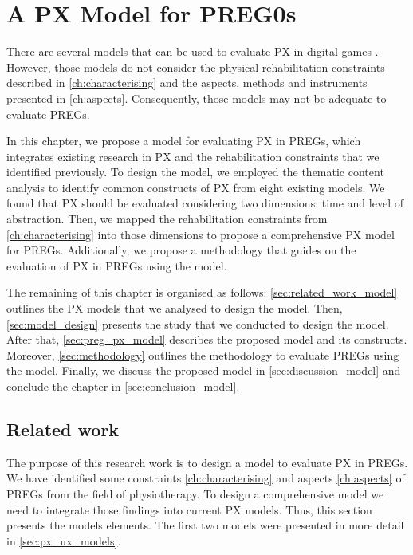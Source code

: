 \chapter{A PX Model for PREG0s}
\label{ch:model}
There are several models that can be used to evaluate \ac{PX} in digital games \autocite{Elson2014,Engl2013,Nackea2,Nacked,Fernandez2008,Mayra,DeKort2007b,Ferrara}. However, those models do not consider the physical rehabilitation constraints described in \autoref{ch:characterising} and the aspects, methods and instruments presented in \autoref{ch:aspects}. Consequently, those models may not be adequate to evaluate \acp{PREG}.

In this chapter, we propose a model for evaluating \ac{PX} in \acp{PREG}, which integrates existing research in \ac{PX} and the rehabilitation constraints that we identified previously. To design the model, we employed the thematic content analysis to identify common constructs of \ac{PX} from eight existing models. We found that \ac{PX} should be evaluated considering two dimensions: time and level of abstraction. Then, we mapped the rehabilitation constraints from \autoref{ch:characterising} into those dimensions to propose a comprehensive \ac{PX} model for \acp{PREG}. Additionally, we propose a methodology that guides on the evaluation of \ac{PX} in \acp{PREG} using the model.

The remaining of this chapter is organised as follows: \autoref{sec:related_work_model} outlines the \ac{PX} models that we analysed to design the model. Then, \autoref{sec:model_design} presents the study that we conducted to design the model. After that, \autoref{sec:preg_px_model} describes the proposed model and its constructs. Moreover, \autoref{sec:methodology} outlines the methodology to evaluate \acp{PREG} using the model. Finally, we discuss the proposed model in \autoref{sec:discussion_model} and conclude the chapter in \autoref{sec:conclusion_model}.

\section{Related work} %
\label{sec:related_work_model}
The purpose of this research work is to design a model to evaluate \ac{PX} in \acp{PREG}. We have identified some constraints \autoref{ch:characterising} and aspects \autoref{ch:aspects} of \acp{PREG} from the field of physiotherapy. To design a comprehensive model we need to integrate those findings into current \ac{PX} models. Thus, this section presents the models elements. The first two models were presented in more detail in \autoref{sec:px_ux_models}.

